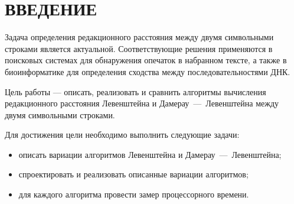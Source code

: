 \chapter*{ВВЕДЕНИЕ}

Задача определения редакционного расстояния между двумя символьными строками является актуальной. Соответствующие решения применяются в поисковых системах для обнаружения опечаток в набранном тексте, а также в биоинформатике для определения сходства между последовательностями ДНК.

Цель работы — описать, реализовать и сравнить алгоритмы вычисления редакционного расстояния Левенштейна и Дамерау~---~Левенштейна между двумя символьными строками.

Для достижения цели необходимо выполнить следующие задачи:
\begin{itemize}[label=--]
    \item описать вариации алгоритмов Левенштейна и Дамерау~---~Левенштейна;
    \item спроектировать и реализовать описанные вариации алгоритмов;
    \item для каждого алгоритма провести замер процессорного времени. 
\end{itemize}
